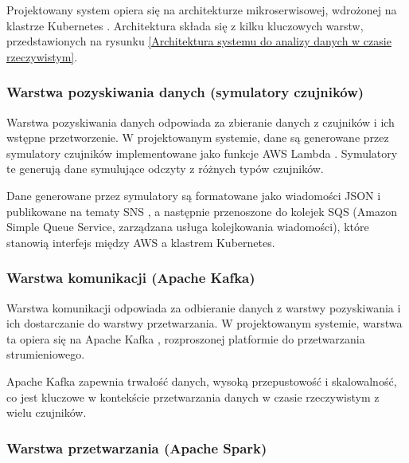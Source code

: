Projektowany system opiera się na architekturze mikroserwisowej, wdrożonej na klastrze Kubernetes \cite{kubernetes_benefits}.
Architektura składa się z kilku kluczowych warstw, przedstawionych na rysunku \ref{Architektura systemu do analizy danych w czasie rzeczywistym}.


\subsubsection{Warstwa pozyskiwania danych (symulatory czujników)}
\label{subsubsec:warstwa_pozyskiwania}

Warstwa pozyskiwania danych odpowiada za zbieranie danych z czujników i ich wstępne przetworzenie.
W projektowanym systemie, dane są generowane przez symulatory czujników implementowane jako funkcje AWS Lambda \cite{aws_lambda_docs}.
Symulatory te generują dane symulujące odczyty z różnych typów czujników.

Dane generowane przez symulatory są formatowane jako wiadomości JSON \cite{json_schema_org} i publikowane na tematy SNS \cite{sns_docs}, a następnie przenoszone do kolejek SQS (Amazon Simple Queue Service, zarządzana usługa kolejkowania wiadomości),
które stanowią interfejs między AWS a klastrem Kubernetes.

\subsubsection{Warstwa komunikacji (Apache Kafka)}
\label{subsubsec:warstwa_komunikacji}

Warstwa komunikacji odpowiada za odbieranie danych z warstwy pozyskiwania i ich dostarczanie do warstwy przetwarzania.
W projektowanym systemie, warstwa ta opiera się na Apache Kafka \cite{kafka}, rozproszonej platformie do przetwarzania strumieniowego.


Apache Kafka zapewnia trwałość danych, wysoką przepustowość i skalowalność, co jest kluczowe w kontekście przetwarzania danych w czasie rzeczywistym z wielu czujników.

\subsubsection{Warstwa przetwarzania (Apache Spark)}
\label{subsubsec:warstwa_przetwarzania}

